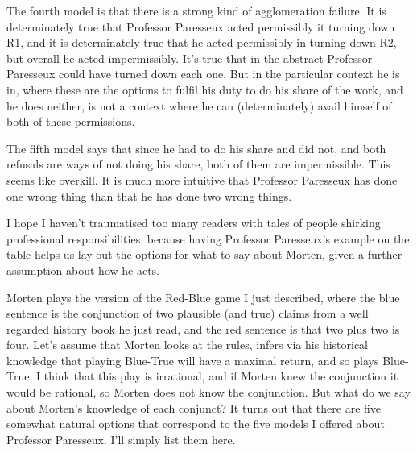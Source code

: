 \documentclass[
  10pt,
  letterpaper,
  twoside]{scrbook}
\begin{document}
The fourth model is that there is a strong kind of agglomeration
failure. It is determinately true that Professor Paresseux acted
permissibly it turning down R1, and it is determinately true that he
acted permissibly in turning down R2, but overall he acted
impermissibly. It's true that in the abstract Professor Paresseux could
have turned down each one. But in the particular context he is in, where
these are the options to fulfil his duty to do his share of the work,
and he does neither, is not a context where he can (determinately) avail
himself of both of these permissions.

The fifth model says that since he had to do his share and did not, and
both refusals are ways of not doing his share, both of them are
impermissible. This seems like overkill. It is much more intuitive that
Professor Paresseux has done one wrong thing than that he has done two
wrong things.

I hope I haven't traumatised too many readers with tales of people
shirking professional responsibilities, because having Professor
Paresseux's example on the table helps us lay out the options for what
to say about Morten, given a further assumption about how he acts.

Morten plays the version of the Red-Blue game I just described, where
the blue sentence is the conjunction of two plausible (and true) claims
from a well regarded history book he just read, and the red sentence is
that two plus two is four. Let's assume that Morten looks at the rules,
infers via his historical knowledge that playing Blue-True will have a
maximal return, and so plays Blue-True. I think that this play is
irrational, and if Morten knew the conjunction it would be rational, so
Morten does not know the conjunction. But what do we say about Morten's
knowledge of each conjunct? It turns out that there are five somewhat
natural options that correspond to the five models I offered about
Professor Paresseux. I'll simply list them here.
\end{document}
